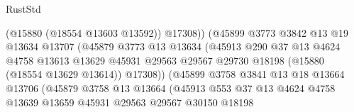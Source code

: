 \begin{lexlean}{RustStd}
\begin{coremodule}
                                          (@15880 (@18554 @13603 @13592))
                                          @17308))
                                      (@45899
                                        @3773
                                        @3842
                                        @13
                                        @19
                                        @13634
                                        @13707
                                        (@45879
                                          @3773
                                          @13
                                          @13634
                                          (@45913
                                            @290
                                            @37
                                            @13
                                            @4624
                                            @4758
                                            @13613
                                            @13629
                                            @45931
                                            @29563
                                            @29567
                                            @29730
                                            @18198
                                            (@15880 (@18554 @13629 @13614))
                                            @17308))
                                        (@45899
                                          @3758
                                          @3841
                                          @13
                                          @18
                                          @13664
                                          @13706
                                          (@45879
                                            @3758
                                            @13
                                            @13664
                                            (@45913
                                              @553
                                              @37
                                              @13
                                              @4624
                                              @4758
                                              @13639
                                              @13659
                                              @45931
                                              @29563
                                              @29567
                                              @30150
                                              @18198

\end{coremodule}
\end{lexlean}
